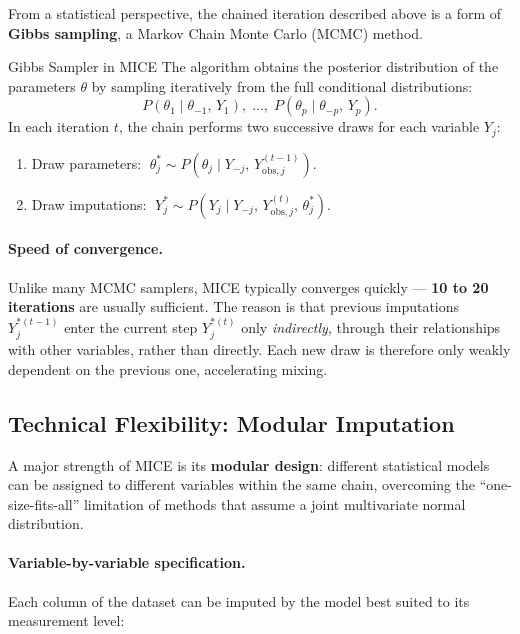 \documentclass[11pt]{article}
\theoremstyle{smallexample}
\begin{document}
From a statistical perspective, the chained iteration described above is a form of
\textbf{Gibbs sampling}, a Markov Chain Monte Carlo (MCMC) method.

 \begin{defbox}{Gibbs Sampler in MICE}
  The algorithm obtains the posterior distribution of the parameters $\theta$ by
  sampling iteratively from the full conditional distributions:
  \[
   P(\theta_1 \mid \theta_{-1},\, Y_1),\; \ldots,\;
   P(\theta_p \mid \theta_{-p},\, Y_p).
  \]
  In each iteration $t$, the chain performs two successive draws for each variable
  $Y_j$:
  \begin{enumerate}
   \item Draw parameters: $\;\theta_j^* \sim P\!\left(\theta_j \mid Y_{-j},\,
     Y_{\text{obs},j}^{(t-1)}\right)$.
   \item Draw imputations: $\;Y_j^* \sim P\!\left(Y_j \mid Y_{-j},\,
     Y_{\text{obs},j}^{(t)},\, \theta_j^*\right)$.
  \end{enumerate}
 \end{defbox}

\paragraph{Speed of convergence.} Unlike many MCMC samplers, MICE typically converges
quickly — \textbf{10 to 20 iterations} are usually sufficient. The reason is that
previous imputations $Y_j^{*(t-1)}$ enter the current step $Y_j^{*(t)}$ only
\emph{indirectly}, through their relationships with other variables, rather than
directly. Each new draw is therefore only weakly dependent on the previous one,
accelerating mixing.

\subsection{Technical Flexibility: Modular Imputation}

A major strength of MICE is its \textbf{modular design}: different statistical models
can be assigned to different variables within the same chain, overcoming the
``one-size-fits-all'' limitation of methods that assume a joint multivariate normal
distribution.

\paragraph{Variable-by-variable specification.} Each column of the dataset can be
imputed by the model best suited to its measurement level:
\end{document}
